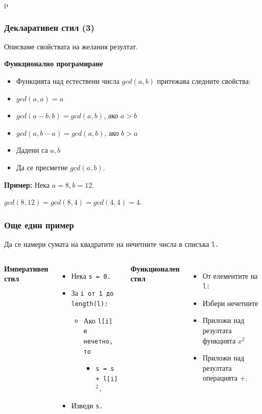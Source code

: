 p\documentclass{beamer}
\begin{document}
\begin{frame}
  \frametitle{Декларативен стил (3)}

  Описваме свойствата на желания резултат.
  \vspace{1em}

  \textbf{Функционално програмиране}

  \begin{itemize}
  \item Функцията над естествени числа $gcd(a,b)$ притежава следните свойства:
  \item $gcd(a,a) = a$
  \item $gcd(a-b,b) = gcd(a,b)$, ако $a > b$
  \item $gcd(a,b-a) = gcd(a,b)$, ако $b > a$
  \item Дадени са $a, b$
  \item Да се пресметне $gcd(a,b)$.
  \end{itemize}

  \pause

  \textbf{Пример:}
  Нека $a = 8, b = 12$.

  $gcd(8,12) = gcd(8,4) = gcd(4,4) = 4$.
\end{frame}

\begin{frame}
  \frametitle{Още един пример}

  Да се намери сумата на квадратите на нечетните числа в списъка \tt l.

  \begin{columns}[t,onlytextwidth]

    \textbf{Императивен стил}
    \begin{itemize}
    \item Нека \tt{s = 0}.
    \item За \tt i от 1 до \tt{length(l)}:
      \begin{itemize}
      \item Ако \tt{l[i]} е нечетно, то
        \begin{itemize}
        \item \tt{s = s + l[i]$^2$}.
        \end{itemize}
      \end{itemize}
    \item Изведи \tt s.
    \end{itemize}


    \textbf{Функционален стил}

    \begin{itemize}
    \item От елементите на \tt l:
    \item Избери нечетните
    \item Приложи над резултата функцията $x^2$
    \item Приложи над резултата операцията $+$.
    \end{itemize}
  \end{columns}
\end{frame}
\end{document}
